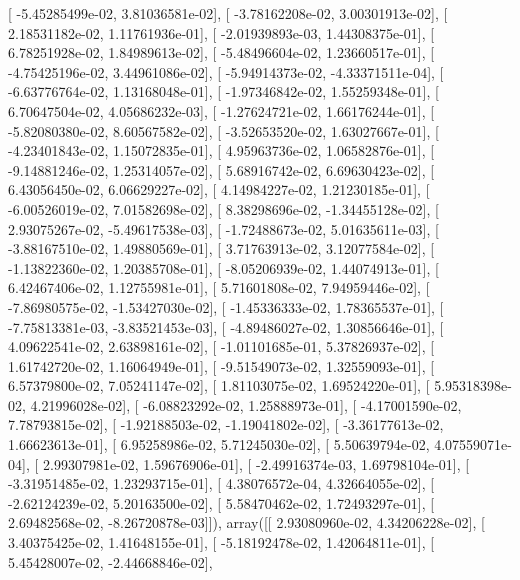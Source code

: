 \documentclass{article}
\begin{document}
       [ -5.45285499e-02,   3.81036581e-02],
       [ -3.78162208e-02,   3.00301913e-02],
       [  2.18531182e-02,   1.11761936e-01],
       [ -2.01939893e-03,   1.44308375e-01],
       [  6.78251928e-02,   1.84989613e-02],
       [ -5.48496604e-02,   1.23660517e-01],
       [ -4.75425196e-02,   3.44961086e-02],
       [ -5.94914373e-02,  -4.33371511e-04],
       [ -6.63776764e-02,   1.13168048e-01],
       [ -1.97346842e-02,   1.55259348e-01],
       [  6.70647504e-02,   4.05686232e-03],
       [ -1.27624721e-02,   1.66176244e-01],
       [ -5.82080380e-02,   8.60567582e-02],
       [ -3.52653520e-02,   1.63027667e-01],
       [ -4.23401843e-02,   1.15072835e-01],
       [  4.95963736e-02,   1.06582876e-01],
       [ -9.14881246e-02,   1.25314057e-02],
       [  5.68916742e-02,   6.69630423e-02],
       [  6.43056450e-02,   6.06629227e-02],
       [  4.14984227e-02,   1.21230185e-01],
       [ -6.00526019e-02,   7.01582698e-02],
       [  8.38298696e-02,  -1.34455128e-02],
       [  2.93075267e-02,  -5.49617538e-03],
       [ -1.72488673e-02,   5.01635611e-03],
       [ -3.88167510e-02,   1.49880569e-01],
       [  3.71763913e-02,   3.12077584e-02],
       [ -1.13822360e-02,   1.20385708e-01],
       [ -8.05206939e-02,   1.44074913e-01],
       [  6.42467406e-02,   1.12755981e-01],
       [  5.71601808e-02,   7.94959446e-02],
       [ -7.86980575e-02,  -1.53427030e-02],
       [ -1.45336333e-02,   1.78365537e-01],
       [ -7.75813381e-03,  -3.83521453e-03],
       [ -4.89486027e-02,   1.30856646e-01],
       [  4.09622541e-02,   2.63898161e-02],
       [ -1.01101685e-01,   5.37826937e-02],
       [  1.61742720e-02,   1.16064949e-01],
       [ -9.51549073e-02,   1.32559093e-01],
       [  6.57379800e-02,   7.05241147e-02],
       [  1.81103075e-02,   1.69524220e-01],
       [  5.95318398e-02,   4.21996028e-02],
       [ -6.08823292e-02,   1.25888973e-01],
       [ -4.17001590e-02,   7.78793815e-02],
       [ -1.92188503e-02,  -1.19041802e-02],
       [ -3.36177613e-02,   1.66623613e-01],
       [  6.95258986e-02,   5.71245030e-02],
       [  5.50639794e-02,   4.07559071e-04],
       [  2.99307981e-02,   1.59676906e-01],
       [ -2.49916374e-03,   1.69798104e-01],
       [ -3.31951485e-02,   1.23293715e-01],
       [  4.38076572e-04,   4.32664055e-02],
       [ -2.62124239e-02,   5.20163500e-02],
       [  5.58470462e-02,   1.72493297e-01],
       [  2.69482568e-02,  -8.26720878e-03]]), array([[  2.93080960e-02,   4.34206228e-02],
       [  3.40375425e-02,   1.41648155e-01],
       [ -5.18192478e-02,   1.42064811e-01],
       [  5.45428007e-02,  -2.44668846e-02],
\end{document}
